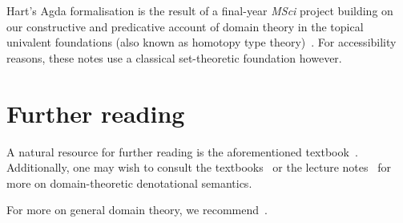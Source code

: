 Hart's Agda formalisation is the result of a final-year \emph{MSci} project
building on our constructive and predicative account of domain theory in the
topical univalent foundations (also known as homotopy type
theory)~\cite{deJong2022}. For accessibility reasons, these notes use a
classical set-theoretic foundation however.

\section{Further reading}

A natural resource for further reading is the aforementioned
textbook~\cite{Streicher2006}.
%
Additionally, one may wish to consult the
textbooks~\cite{Winskel1993,Gunther1992} or the lecture
notes~\cite{Plotkin1983,PittsWinskelFiore2012} for more on domain-theoretic denotational
semantics.

For more on general domain theory, we
recommend~\cite{AbramskyJung1994,GierzEtAl2003}.


